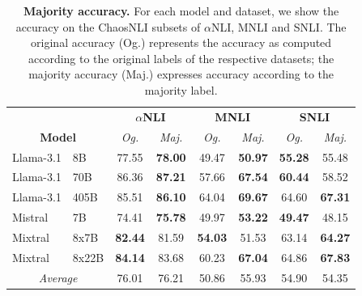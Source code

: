 \begin{table}
    \centering
    \begin{tabular}{llcccccc}
        & & \multicolumn{2}{c}{\textbf{$\alpha$NLI}} & \multicolumn{2}{c}{\textbf{MNLI}} & \multicolumn{2}{c}{\textbf{SNLI}} \\
        \multicolumn{2}{c}{\textbf{Model}} & \textit{Og.} & \textit{Maj.} & \textit{Og.} & \textit{Maj.} & \textit{Og.} & \textit{Maj.}\\
        \toprule
        Llama-3.1 & 8B & 77.55 & \textbf{78.00} & 49.47 & \textbf{50.97} & \textbf{55.28} & 55.48 \\
        Llama-3.1 & 70B & 86.36 & \textbf{87.21} & 57.66 & \textbf{67.54} & \textbf{60.44} & 58.52 \\
        Llama-3.1 & 405B & 85.51 & \textbf{86.10} & 64.04 & \textbf{69.67} & 64.60 & \textbf{67.31} \\
        \midrule
        Mistral & 7B & 74.41 & \textbf{75.78} & 49.97 & \textbf{53.22} & \textbf{49.47} & 48.15 \\
        Mixtral & 8x7B & \textbf{82.44} & 81.59 & \textbf{54.03} & 51.53 & 63.14 & \textbf{64.27} \\
        Mixtral & 8x22B & \textbf{84.14} & 83.68 & 60.23 & \textbf{67.04} & 64.86 & \textbf{67.83} \\
        \midrule
        \multicolumn{2}{c}{\emph{Average}} & 76.01 & 76.21 & 50.86 & 55.93 & 54.90 & 54.35 \\
    \bottomrule
    \end{tabular}
    \caption{\textbf{Majority accuracy.} For each model and dataset, we show the accuracy on the ChaosNLI subsets of $\alpha$NLI, MNLI and SNLI. The original accuracy (Og.) represents the accuracy as computed according to the original labels of the respective datasets; the majority accuracy (Maj.) expresses accuracy according to the majority label.}
\label{tab:chaos_acc}
\end{table}

